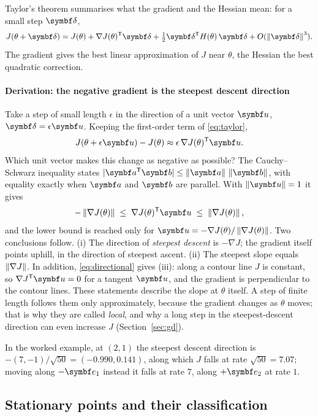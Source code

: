 \documentclass[11pt]{article}
\newcommand{\dvec}{\vect{\delta}}
\newcommand{\evec}{\vect{e}}
\newcommand{\uvec}{\vect{u}}
\begin{document}
Taylor's theorem summarises what the gradient and the Hessian mean: for a small step $\dvec$,
\begin{equation}\label{eq:taylor}
  J(\theta + \dvec) = J(\theta) + \nabla J(\theta)\T\dvec + \tfrac12 \dvec\T H(\theta)\,\dvec + O(\norm{\dvec}^3) .
\end{equation}
The gradient gives the best linear approximation of $J$ near $\theta$, the Hessian the best quadratic correction.

\paragraph{Derivation: the negative gradient is the steepest descent direction} Take a step of small length
$\epsilon$ in the direction of a unit vector $\uvec$, $\dvec = \epsilon\uvec$. Keeping the first-order term of
\eqref{eq:taylor},
\[
  J(\theta + \epsilon\uvec) - J(\theta) \approx \epsilon\, \nabla J(\theta)\T\uvec .
\]
Which unit vector makes this change as negative as possible? The Cauchy--Schwarz inequality states
$|\vect{a}\T\vect{b}| \le \norm{\vect{a}}\,\norm{\vect{b}}$, with equality exactly when $\vect{a}$ and $\vect{b}$ are
parallel. With $\norm{\uvec} = 1$ it gives
\[
  -\norm{\nabla J(\theta)} \;\le\; \nabla J(\theta)\T\uvec \;\le\; \norm{\nabla J(\theta)} ,
\]
and the lower bound is reached only for $\uvec = -\nabla J(\theta)/\norm{\nabla J(\theta)}$. Two conclusions
follow. (i) The direction of \emph{steepest descent} is $-\nabla J$; the gradient itself points uphill, in the
direction of steepest ascent. (ii) The steepest slope equals $\left\lVert \nabla J \right\rVert$. In addition, \eqref{eq:directional}
gives (iii): along a contour line $J$ is constant, so $\nabla J\T\uvec = 0$ for a tangent $\uvec$, and the gradient is
perpendicular to the contour lines. These statements describe the slope at $\theta$ itself. A step of finite length
follows them only approximately, because the gradient changes as $\theta$ moves; that is why they are called
\emph{local}, and why a long step in the steepest-descent direction can even increase $J$ (Section~\ref{sec:gd}).

In the worked example, at $(2, 1)$ the steepest descent direction is $-(7, -1)/\sqrt{50} = (-0.990, 0.141)$, along
which $J$ falls at rate $\sqrt{50} = 7.07$; moving along $-\evec_1$ instead it falls at rate $7$, along $+\evec_2$ at
rate $1$.

\subsection{Stationary points and their classification}\label{sec:stationary}
\end{document}
